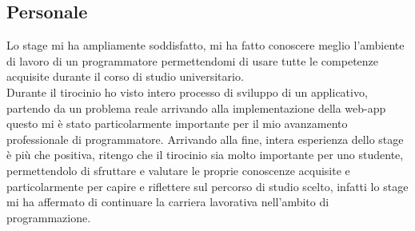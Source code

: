 \subsection{Personale}
Lo stage mi ha ampliamente soddisfatto, mi ha fatto conoscere meglio l'ambiente di lavoro di un programmatore permettendomi di usare tutte le competenze acquisite durante il corso di studio universitario.\\
Durante il tirocinio ho visto intero processo di sviluppo di un applicativo, partendo da un problema reale arrivando alla implementazione della web-app questo mi è stato particolarmente importante per il mio avanzamento professionale di programmatore.
Arrivando alla fine, intera esperienza dello stage è più che positiva, ritengo che il tirocinio sia molto importante per uno studente, permettendolo di sfruttare e valutare le proprie conoscenze acquisite e particolarmente per capire e riflettere sul percorso di studio scelto, infatti lo stage mi ha affermato di continuare la carriera lavorativa nell'ambito di programmazione.